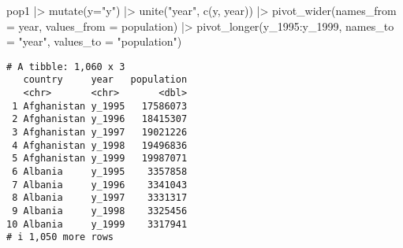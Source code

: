 \documentclass[
  letterpaper,
  DIV=11,
  numbers=noendperiod]{scrreprt}
\newenvironment{Shaded}{\begin{snugshade}}{\end{snugshade}}
\newcommand{\AttributeTok}[1]{\textcolor[rgb]{0.40,0.45,0.13}{#1}}
\newcommand{\FunctionTok}[1]{\textcolor[rgb]{0.28,0.35,0.67}{#1}}
\newcommand{\NormalTok}[1]{\textcolor[rgb]{0.00,0.23,0.31}{#1}}
\newcommand{\SpecialCharTok}[1]{\textcolor[rgb]{0.37,0.37,0.37}{#1}}
\newcommand{\StringTok}[1]{\textcolor[rgb]{0.13,0.47,0.30}{#1}}
\begin{document}
\begin{Shaded}
\begin{Highlighting}[]
\NormalTok{pop1 }\SpecialCharTok{|\textgreater{}} \FunctionTok{mutate}\NormalTok{(}\AttributeTok{y=}\StringTok{"y"}\NormalTok{) }\SpecialCharTok{|\textgreater{}} \FunctionTok{unite}\NormalTok{(}\StringTok{"year"}\NormalTok{, }\FunctionTok{c}\NormalTok{(y, year)) }\SpecialCharTok{|\textgreater{}}
    \FunctionTok{pivot\_wider}\NormalTok{(}\AttributeTok{names\_from =}\NormalTok{ year, }\AttributeTok{values\_from =}\NormalTok{ population) }\SpecialCharTok{|\textgreater{}}
    \FunctionTok{pivot\_longer}\NormalTok{(y\_1995}\SpecialCharTok{:}\NormalTok{y\_1999, }\AttributeTok{names\_to =} \StringTok{"year"}\NormalTok{, }\AttributeTok{values\_to =} \StringTok{"population"}\NormalTok{)}
\end{Highlighting}
\end{Shaded}

\begin{verbatim}
# A tibble: 1,060 x 3
   country     year   population
   <chr>       <chr>       <dbl>
 1 Afghanistan y_1995   17586073
 2 Afghanistan y_1996   18415307
 3 Afghanistan y_1997   19021226
 4 Afghanistan y_1998   19496836
 5 Afghanistan y_1999   19987071
 6 Albania     y_1995    3357858
 7 Albania     y_1996    3341043
 8 Albania     y_1997    3331317
 9 Albania     y_1998    3325456
10 Albania     y_1999    3317941
# i 1,050 more rows
\end{verbatim}
\end{document}
